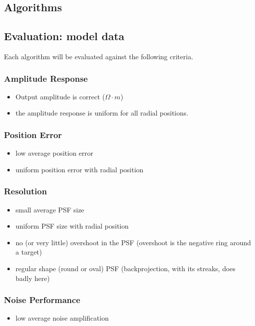 \documentclass[letterpaper,twocolumn,11pt]{article}
\begin{document}
\subsection{Algorithms}
\subsection{Evaluation: model data}

Each algorithm will be evaluated against the
following criteria.

\subsubsection{Amplitude Response}
   \begin{itemize}
   \item Output amplitude is correct ($\Omega \cdot m$)
   \item the amplitude response is uniform for all radial positions.
   \end{itemize}

\subsubsection{Position Error}
   \begin{itemize}
   \item low average position error
   \item uniform position error with radial position
   \end{itemize}

\subsubsection{ Resolution}
   \begin{itemize}
   \item small average PSF size
   \item uniform PSF size with radial position
   \item no (or very little) overshoot in the PSF
  (overshoot is the negative ring around a target)
   \item regular shape (round or oval) PSF
  (backprojection, with its streaks, does badly here)
   \end{itemize}

\subsubsection{ Noise Performance}
   \begin{itemize}
   \item low average noise amplification
   \end{itemize}
\end{document}
